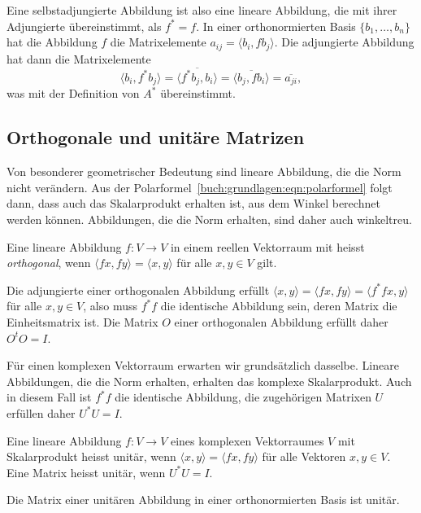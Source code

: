 Eine selbstadjungierte Abbildung ist also eine lineare Abbildung,
die mit ihrer Adjungierte übereinstimmt, als $f^* = f$.
In einer orthonormierten Basis $\{b_1,\dots,b_n\}$ hat die Abbildung
$f$ die Matrixelemente $a_{ij}=\langle b_i,fb_j\rangle$.
Die adjungierte Abbildung hat dann die Matrixelemente
\[
\langle b_i,f^*b_j \rangle
=
\overline{\langle f^*b_j,b_i\rangle}
=
\overline{\langle b_j,fb_i\rangle}
=
\overline{a_{ji}},
\]
was mit der Definition von $A^*$ übereinstimmt.

\subsection{Orthogonale und unitäre Matrizen
\label{buch:subsection:orthogonale-und-unitaere-matrizen}}
Von besonderer geometrischer Bedeutung sind lineare Abbildung,
die die Norm nicht verändern.
Aus der Polarformel~\eqref{buch:grundlagen:eqn:polarformel}
folgt dann, dass auch das Skalarprodukt erhalten ist, aus dem
Winkel berechnet werden können.
Abbildungen, die die Norm erhalten, sind daher auch winkeltreu.

\begin{definition}
Eine lineare Abbildung $f\colon V\to V$ in einem reellen
Vektorraum mit heisst {\em orthogonal}, wenn
$\langle fx,fy\rangle = \langle x,y\rangle$ für alle
$x,y\in V$ gilt.
\end{definition}

Die adjungierte einer orthogonalen Abbildung erfüllt
$\langle x,y\rangle = \langle fx,fy\rangle = \langle f^*f x, y\rangle$
für alle $x,y\in V$, also muss $f^*f$ die identische Abbildung sein,
deren Matrix die Einheitsmatrix ist.
Die Matrix $O$ einer orthogonalen Abbildung erfüllt daher $O^tO=I$.

Für einen komplexen Vektorraum erwarten wir grundsätzlich dasselbe.
Lineare Abbildungen, die die Norm erhalten, erhalten das komplexe
Skalarprodukt.
Auch in diesem Fall ist $f^*f$ die identische Abbildung, die zugehörigen
Matrixen $U$ erfüllen daher $U^*U=I$.

\begin{definition}
Eine lineare Abbildung $f\colon V\to V$ eines komplexen Vektorraumes
$V$ mit Skalarprodukt heisst unitär,
wenn $\langle x,y\rangle = \langle fx,fy\rangle$ für alle Vektoren $x,y\in V$.
Eine Matrix heisst unitär, wenn $U^*U=I$.
\end{definition}

Die Matrix einer unitären Abbildung in einer orthonormierten Basis ist unitär.

